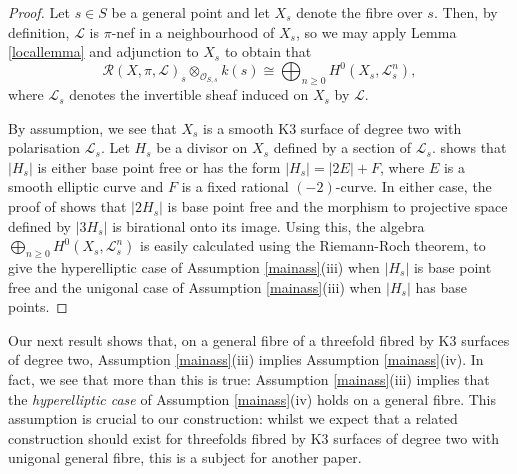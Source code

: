 \documentclass{amsart}
\begin{document}
\begin{proof} Let $s \in S$ be a general point and let $X_s$ denote the fibre over $s$. Then, by definition, ${\mathcal{L}}$ is $\pi$-nef in a neighbourhood of $X_s$, so we may apply Lemma \ref{locallemma} and adjunction to $X_s$ to obtain that 
\[{\mathcal{R}}(X,\pi,{\mathcal{L}})_s \otimes_{{\mathcal{O}}_{S,s}} k(s) \cong \bigoplus_{n \geq 0} H^0(X_s, {\mathcal{L}}_s^n),\]
where ${\mathcal{L}}_s$ denotes the invertible sheaf induced on $X_s$ by ${\mathcal{L}}$. 

By assumption, we see that $X_s$ is a smooth K3 surface of degree two with polarisation ${\mathcal{L}}_s$. Let $H_s$ be a divisor on $X_s$ defined by a section of ${\mathcal{L}}_s$. \cite[Proposition 8]{fk3s} shows that $|H_s|$ is either base point free or has the form $|H_s| = |2E| +F$, where $E$ is a smooth elliptic curve and $F$ is a fixed rational $(-2)$-curve. In either case, the proof of \cite[Corollary 5]{fk3s} shows that $|2H_s|$ is base point free and the morphism to projective space defined by $|3H_s|$ is birational onto its image. Using this, the algebra $\bigoplus_{n \geq 0} H^0(X_s, {\mathcal{L}}_s^n)$ is easily calculated using the Riemann-Roch theorem, to give the hyperelliptic case of Assumption \ref{mainass}(iii) when $|H_s|$ is base point free and the unigonal case of Assumption \ref{mainass}(iii) when $|H_s|$ has base points. \end{proof}

Our next result shows that, on a general fibre of a threefold fibred by K3 surfaces of degree two, Assumption \ref{mainass}(iii) implies Assumption \ref{mainass}(iv). In fact, we see that more than this is true: Assumption \ref{mainass}(iii) implies that the \emph{hyperelliptic case} of Assumption \ref{mainass}(iv) holds on a general fibre. This assumption is crucial to our construction: whilst we expect that a related construction should exist for threefolds fibred by K3 surfaces of degree two with unigonal general fibre, this is a subject for another paper.
\end{document}
